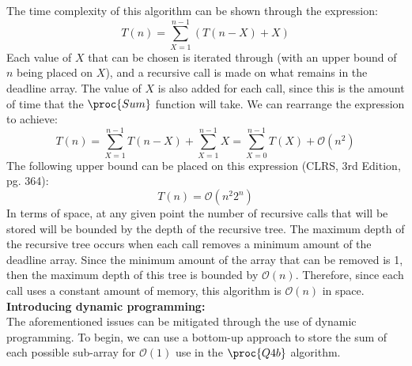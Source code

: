 The time complexity of this algorithm can be shown through the expression:
\[T(n) = \sum_{X = 1}^{n-1}(T(n - X) + X)\]
Each value of $X$ that can be chosen is iterated through (with an upper bound of $n$ being placed on $X$), and a recursive call is made on what remains in the deadline array.
The value of $X$ is also added for each call, since this is the amount of time that the $\proc{Sum}$ function will take.
We can rearrange the expression to achieve:
\[T(n) = \sum_{X = 1}^{n-1}T(n - X) + \sum_{X = 1}^{n-1}X = \sum_{X = 0}^{n-1}T(X) + \mathcal{O}(n^2)\]
The following upper bound can be placed on this expression (CLRS, 3rd Edition, pg. 364):
\[T(n) = \mathcal{O}({n^2}{2^n})\]
In terms of space, at any given point the number of recursive calls that will be stored will be bounded by the depth of the recursive tree.
The maximum depth of the recursive tree occurs when each call removes a minimum amount of the deadline array.
Since the minimum amount of the array that can be removed is 1, then the maximum depth of this tree is bounded by $\mathcal{O}(n)$.
Therefore, since each call uses a constant amount of memory, this algorithm is $\mathcal{O}(n)$ in space. \\

\textbf{Introducing dynamic programming:}\\
The aforementioned issues can be mitigated through the use of dynamic programming.
To begin, we can use a bottom-up approach to store the sum of each possible sub-array for $\mathcal{O}(1)$ use in the $\proc{Q4b}$ algorithm.

